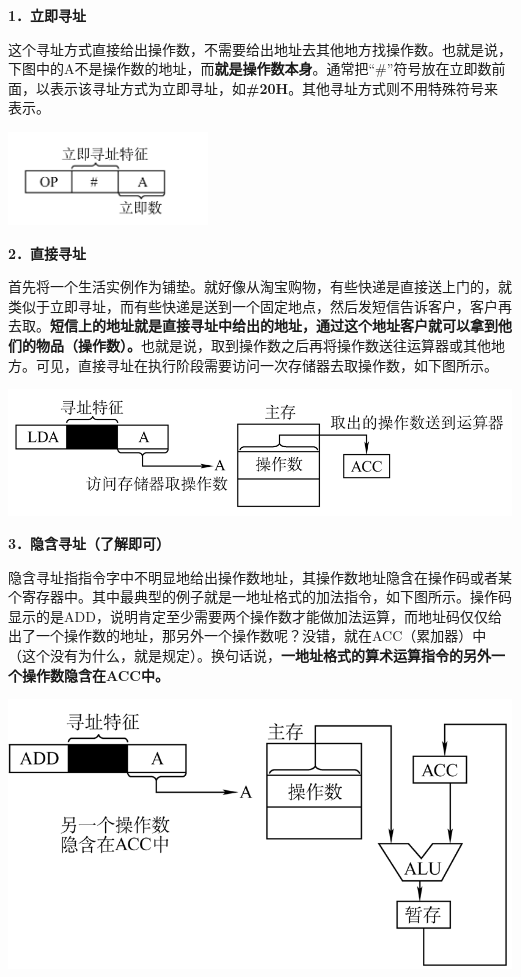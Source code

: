 {\textbf{1．立即寻址}}

这个寻址方式直接给出操作数，不需要给出地址去其他地方找操作数。也就是说，下图中的A不是操作数的地址，而\textbf{就是操作数本身}。通常把``\#''符号放在立即数前面，以表示该寻址方式为立即寻址，如\textbf{\#20H}。其他寻址方式则不用特殊符号来表示。

\includegraphics[width=2.08333in,height=0.96875in]{png-jpeg-pics/1217CD46D18068794B47170C8560B3F8.png}

{\textbf{2．直接寻址}}

首先将一个生活实例作为铺垫。就好像从淘宝购物，有些快递是直接送上门的，就类似于立即寻址，而有些快递是送到一个固定地点，然后发短信告诉客户，客户再去取。\textbf{短信上的地址就是直接寻址中给出的地址，通过这个地址客户就可以拿到他们的物品（操作数）。}也就是说，取到操作数之后再将操作数送往运算器或其他地方。可见，直接寻址在执行阶段需要访问一次存储器去取操作数，如下图所示。

\includegraphics[width=6in]{png-jpeg-pics/316231AD55846BF7C576AA754E41385C.png}

{\textbf{3．隐含寻址（了解即可）}}

隐含寻址指指令字中不明显地给出操作数地址，其操作数地址隐含在操作码或者某个寄存器中。其中最典型的例子就是一地址格式的加法指令，如下图所示。操作码显示的是ADD，说明肯定至少需要两个操作数才能做加法运算，而地址码仅仅给出了一个操作数的地址，那另外一个操作数呢？没错，就在ACC（累加器）中（这个没有为什么，就是规定）。换句话说，\textbf{一地址格式的算术运算指令的另外一个操作数隐含在ACC中。}

\textbf{\includegraphics[width=6in]{png-jpeg-pics/3930ABDAB3E51036A984314FE155DF51.png}\\
}

